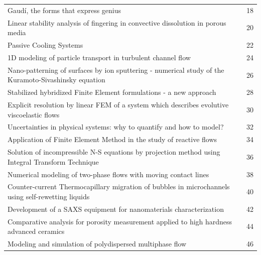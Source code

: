 \documentclass[11pt,a4paper]{book} %
\begin{document}
\hspace{-8mm}
\begin{tabular}{lc}
	Gaudí, the forms that express genius & 18\\
	Linear stability analysis of fingering in convective dissolution in porous media & 20\\
	Passive Cooling Systems & 22\\
	1D modeling of particle transport in turbulent channel flow & 24\\
	Nano-patterning of surfaces by ion sputtering - numerical study of the Kuramoto-Sivashinsky equation & 26\\
	Stabilized hybridized Finite Element formulations - a new approach & 28\\
	Explicit resolution by linear FEM of a system which describes evolutive viscoelastic flows & 30\\
	Uncertainties in physical systems: why to quantify and how to model? & 32\\
	Application of Finite Element Method in the study of reactive flows & 34\\
	Solution of incompressible N-S equations by projection method using Integral Transform Technique & 36\\
	Numerical modeling of two-phase flows with moving contact lines & 38\\
	Counter-current Thermocapillary migration of bubbles in microchannels using self-rewetting liquids & 40\\
	Development of a SAXS equipment for nanomaterials characterization & 42\\
	Comparative analysis for porosity measurement applied to high hardness advanced ceramics & 44\\
	Modeling and simulation of polydispersed multiphase flow & 46\\
\end{tabular}

%















\end{document}
